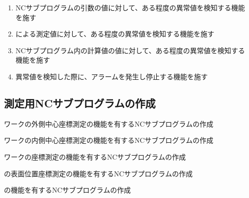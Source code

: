 \begin{enumerate}[label*=\alph*)]
\item NCサブプログラムの引数の値に対して、ある程度の異常値を検知する機能を施す
\item \TouchSensorProbe による測定値に対して、ある程度の異常値を検知する機能を施す
\item NCサブプログラム内の計算値の値に対して、ある程度の異常値を検知する機能を施す
\item 異常値を検知した際に、アラームを発生し停止する機能を施す
\end{enumerate}



\clearpage


\subsection{測定用NCサブプログラムの作成}
\begin{enumerate}[label={\sarrow[red]}]
\item ワークの外側中心座標測定の機能を有するNCサブプログラムの作成
\item ワークの内側中心座標測定の機能を有するNCサブプログラムの作成
\item ワークの\OutcutCenter 座標測定の機能を有するNCサブプログラムの作成
\item \Dimple の表面位置座標測定の機能を有するNCサブプログラムの作成
\item \CenterlineEndFaceDifMeasurement の機能を有するNCサブプログラムの作成
\end{enumerate}


